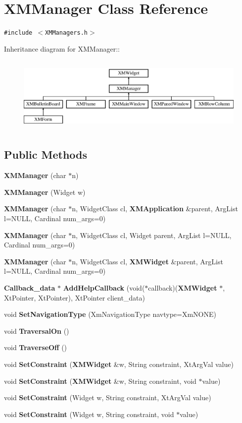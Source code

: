 \section{XMManager  Class Reference}
\label{classXMManager}
{\tt \#include $<$XMManagers.h$>$}

Inheritance diagram for XMManager::\begin{figure}[H]
\begin{center}
\leavevmode
\includegraphics[height=3.73333cm]{classXMManager}
\end{center}
\end{figure}
\subsection*{Public Methods}
\begin{CompactItemize}
\item 
{\bf XMManager} (char $\ast$n)
\item 
{\bf XMManager} (Widget w)
\item 
{\bf XMManager} (char $\ast$n, Widget\-Class cl, {\bf XMApplication} \&parent, Arg\-List l=NULL, Cardinal num\_\-args=0)
\item 
{\bf XMManager} (char $\ast$n, Widget\-Class cl, Widget parent, Arg\-List l=NULL, Cardinal num\_\-args=0)
\item 
{\bf XMManager} (char $\ast$n, Widget\-Class cl, {\bf XMWidget} \&parent, Arg\-List l=NULL, Cardinal num\_\-args=0)
\item 
{\bf Callback\_\-data} $\ast$ {\bf Add\-Help\-Callback} (void($\ast$callback)({\bf XMWidget} $\ast$, Xt\-Pointer, Xt\-Pointer), Xt\-Pointer client\_\-data)
\item 
void {\bf Set\-Navigation\-Type} (Xm\-Navigation\-Type navtype=Xm\-NONE)
\item 
void {\bf Traversal\-On} ()
\item 
void {\bf Traverse\-Off} ()
\item 
void {\bf Set\-Constraint} ({\bf XMWidget} \&w, String constraint, Xt\-Arg\-Val value)
\item 
void {\bf Set\-Constraint} ({\bf XMWidget} \&w, String constraint, void $\ast$value)
\item 
void {\bf Set\-Constraint} (Widget w, String constraint, Xt\-Arg\-Val value)
\item 
void {\bf Set\-Constraint} (Widget w, String constraint, void $\ast$value)
\end{CompactItemize}


